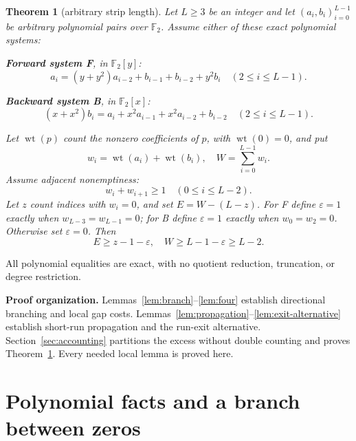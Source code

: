 \documentclass{article}
\newtheorem{theorem}{Theorem}
\DeclareMathOperator{\wt}{wt}
\begin{document}
\begin{theorem}[arbitrary strip length]\label{thm:strip}
  Let \(L\ge3\) be an integer and let \((a_i,b_i)_{i=0}^{L-1}\) be arbitrary polynomial pairs over \(\mathbb{F}_2\). Assume either of these exact polynomial systems:

  \textbf{Forward system F}, in \(\mathbb{F}_2[y]\):
  \begin{equation}\label{eq:forward}
    a_i = (y + y^2) a_{i-2} + b_{i-1} + b_{i-2} + y^2 b_i \quad (2 \le i \le L-1).
  \end{equation}

  \textbf{Backward system B}, in \(\mathbb{F}_2[x]\):
  \begin{equation}\label{eq:backward}
    (x + x^2) b_i = a_i + x^2 a_{i-1} + x^2 a_{i-2} + b_{i-2} \quad (2 \le i \le L-1).
  \end{equation}

  Let \(\wt(p)\) count the nonzero coefficients of \(p\), with \(\wt(0) = 0\), and put
  \begin{equation}
    w_i = \wt(a_i) + \wt(b_i), \quad W = \sum_{i=0}^{L-1} w_i.
  \end{equation}
  Assume adjacent nonemptiness:
  \begin{equation}\label{eq:adjacent}
    w_i + w_{i+1} \ge 1 \quad (0 \le i \le L-2).
  \end{equation}
  Let \(z\) count indices with \(w_i = 0\), and set \(E = W - (L - z)\). For F define
  \(\varepsilon = 1\) exactly when \(w_{L-3} = w_{L-1} = 0\); for B define \(\varepsilon = 1\) exactly
  when \(w_0 = w_2 = 0\). Otherwise set \(\varepsilon = 0\). Then
  \begin{equation}\label{eq:main-bound}
    E \ge z - 1 - \varepsilon, \quad W \ge L-1 - \varepsilon \ge L-2.
  \end{equation}
\end{theorem}


All polynomial equalities are exact, with no quotient reduction, truncation, or degree restriction.

\textbf{Proof organization.} Lemmas~\ref{lem:branch}--\ref{lem:four} establish directional
branching and local gap costs. Lemmas~\ref{lem:propagation}--\ref{lem:exit-alternative} establish
short-run propagation and the run-exit alternative. Section~\ref{sec:accounting} partitions the
excess without double counting and proves Theorem~\ref{thm:strip}. Every needed local lemma is proved
here.

\section{Polynomial facts and a branch between zeros}\label{sec:polynomial}
\end{document}

